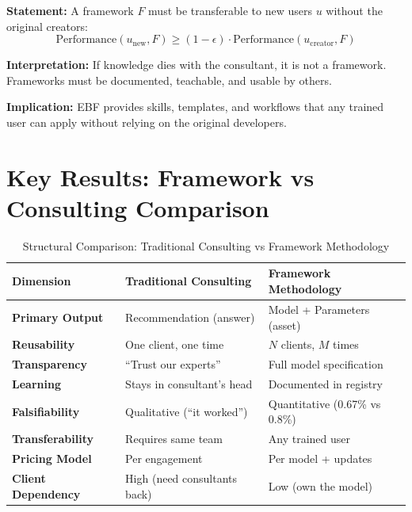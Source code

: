 \begin{tcolorbox}[colback=gray!5!white, colframe=gray!75!black,
    title=Axiom FM-5: Transferability Principle]
\textbf{Statement:} A framework $F$ must be transferable to new users $u$ without the original creators:
\begin{equation}
\text{Performance}(u_{\text{new}}, F) \geq (1 - \epsilon) \cdot \text{Performance}(u_{\text{creator}}, F)
\end{equation}

\textbf{Interpretation:} If knowledge dies with the consultant, it is not a framework. Frameworks must be documented, teachable, and usable by others.

\textbf{Implication:} EBF provides skills, templates, and workflows that any trained user can apply without relying on the original developers.
\end{tcolorbox}


\section{Key Results: Framework vs Consulting Comparison}
\label{sec:fm-comparison}

\begin{table}[htbp]
\centering
\caption{Structural Comparison: Traditional Consulting vs Framework Methodology}
\label{tab:fm-comparison}
\renewcommand{\arraystretch}{1.4}
\begin{tabular}{@{}p{3.5cm}p{5cm}p{5cm}@{}}
\toprule
\textbf{Dimension} & \textbf{Traditional Consulting} & \textbf{Framework Methodology} \\
\midrule
\textbf{Primary Output} & Recommendation (answer) & Model + Parameters (asset) \\
\textbf{Reusability} & One client, one time & $N$ clients, $M$ times \\
\textbf{Transparency} & ``Trust our experts'' & Full model specification \\
\textbf{Learning} & Stays in consultant's head & Documented in registry \\
\textbf{Falsifiability} & Qualitative (``it worked'') & Quantitative (0.67\% vs 0.8\%) \\
\textbf{Transferability} & Requires same team & Any trained user \\
\textbf{Pricing Model} & Per engagement & Per model + updates \\
\textbf{Client Dependency} & High (need consultants back) & Low (own the model) \\
\bottomrule
\end{tabular}
\end{table}


